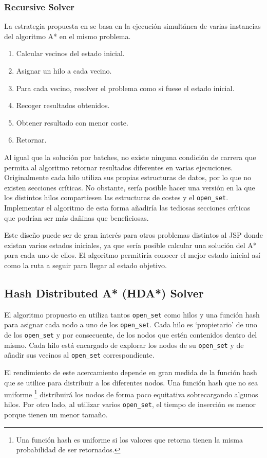 \subsubsection{Recursive Solver}

La estrategia propuesta en \cite{Zag17} se basa en la ejecución
simultánea de varias instancias del algoritmo A* en el mismo problema.
\begin{enumerate}[itemsep=0.25px]
    \item Calcular vecinos del estado inicial.
    \item Asignar un hilo a cada vecino.
    \item Para cada vecino, resolver el problema como si fuese el estado inicial.
    \item Recoger resultados obtenidos.
    \item Obtener resultado con menor coste.
    \item Retornar.
\end{enumerate}

Al igual que la solución por batches,
no existe ninguna condición de carrera que permita
al algoritmo retornar resultados diferentes
en varias ejecuciones.
Originalmente cada hilo utiliza sus propias estructuras
de datos, por lo que no existen secciones críticas.
No obstante, sería posible hacer una versión en la que
los distintos hilos compartiesen las estructuras de costes
y el \lstinline{open_set}.
Implementar el algoritmo de esta forma añadiría las
tediosas secciones críticas que podrían ser más
dañinas que beneficiosas.

Este diseño puede ser de gran interés para otros problemas
distintos al JSP donde existan varios estados iniciales,
ya que sería posible calcular una solución del A*
para cada uno de ellos.
El algoritmo permitiría conocer el mejor estado inicial
así como la ruta a seguir para llegar al estado objetivo.

\subsection{Hash Distributed A* (HDA*) Solver}

El algoritmo propuesto en \cite{KFB09}
utiliza tantos \lstinline{open_set} como hilos
y una función hash para asignar cada nodo a uno de los
\lstinline{open_set}.
Cada hilo es `propietario' de uno de los \lstinline{open_set}
y por consecuente, de los nodos que estén contenidos
dentro del mismo.
Cada hilo está encargado de explorar los nodos de su
\lstinline{open_set} y de añadir sus vecinos
al \lstinline{open_set} correspondiente.

El rendimiento de este acercamiento depende en gran medida de la
función hash que se utilice para distribuir a los diferentes nodos.
Una función hash que no sea uniforme
\footnote{Una función hash es uniforme si los valores que retorna
tienen la misma probabilidad de ser retornados.}
distribuirá los nodos de forma poco equitativa
sobrecargando algunos hilos.
Por otro lado, al utilizar varios \lstinline{open_set},
el tiempo de inserción es menor porque tienen un menor tamaño.

